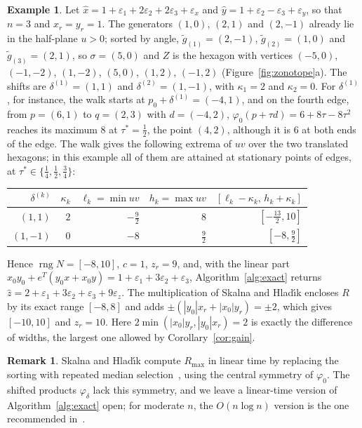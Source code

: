 \documentclass[11pt]{article}
\theoremstyle{definition}
\newtheorem{example}{Example}
\newtheorem{remark}{Remark}
\newcommand{\eps}{\varepsilon}
\newcommand{\ex}{\eps_x}
\newcommand{\ey}{\eps_y}
\newcommand{\rng}{\operatorname{rng}}
\begin{document}
\begin{example}
\label{ex:alg}
Let $\hat x=1+\eps_1+2\eps_2+2\eps_3+\ex$ and $\hat y=1+\eps_2-\eps_3+\ey$, so that $n=3$ and $x_r=y_r=1$. The generators $(1,0)$, $(2,1)$ and $(2,-1)$ already lie in the half-plane $u>0$; sorted by angle, $\tilde g_{(1)}=(2,-1)$, $\tilde g_{(2)}=(1,0)$ and $\tilde g_{(3)}=(2,1)$, so $\sigma=(5,0)$ and $Z$ is the hexagon with vertices $(-5,0)$, $(-1,-2)$, $(1,-2)$, $(5,0)$, $(1,2)$, $(-1,2)$ (Figure~\ref{fig:zonotope}a). The shifts are $\delta^{(1)}=(1,1)$ and $\delta^{(2)}=(1,-1)$, with $\kappa_1=2$ and $\kappa_2=0$. For $\delta^{(1)}$, for instance, the walk starts at $p_0+\delta^{(1)}=(-4,1)$, and on the fourth edge, from $p=(6,1)$ to $q=(2,3)$ with $d=(-4,2)$, $\varphi_0(p+\tau d)=6+8\tau-8\tau^2$ reaches its maximum $8$ at $\tau^*=\tfrac12$, the point $(4,2)$, although it is $6$ at both ends of the edge. The walk gives the following extrema of $uv$ over the two translated hexagons; in this example all of them are attained at stationary points of edges, at $\tau^*\in\{\tfrac14,\tfrac12,\tfrac34\}$:
\begin{center}
\small
\begin{tabular}{rrrrr}
\toprule
$\delta^{(k)}$ & $\kappa_k$ & $\ell_k=\min uv$ & $h_k=\max uv$ & $[\ell_k-\kappa_k,\,h_k+\kappa_k]$ \\
\midrule
$(1,1)$ & $2$ & $-\tfrac92$ & $8$ & $[-\tfrac{13}2,10]$ \\
$(1,-1)$ & $0$ & $-8$ & $\tfrac92$ & $[-8,\tfrac92]$ \\
\bottomrule
\end{tabular}
\end{center}
Hence $\rng N=[-8,10]$, $c=1$, $z_r=9$, and, with the linear part $x_0y_0+e^T(y_0x+x_0y)=1+\eps_1+3\eps_2+\eps_3$, Algorithm~\ref{alg:exact} returns $\hat z=2+\eps_1+3\eps_2+\eps_3+9\eps_z$. The multiplication of Skalna and Hlad\'{\i}k encloses $R$ by its exact range $[-8,8]$ and adds $\pm(|y_0|x_r+|x_0|y_r)=\pm2$, which gives $[-10,10]$ and $z_r=10$. Here $2\min(|x_0|y_r,|y_0|x_r)=2$ is exactly the difference of widths, the largest one allowed by Corollary~\ref{cor:gain}.
\end{example}

\begin{remark}
Skalna and Hlad\'{\i}k compute $R_{\max}$ in linear time by replacing the sorting with repeated median selection~\cite[Prop.~8]{skalna2017new}, using the central symmetry of $\varphi_0$. The shifted products $\varphi_\delta$ lack this symmetry, and we leave a linear-time version of Algorithm~\ref{alg:exact} open; for moderate $n$, the $O(n\log n)$ version is the one recommended in~\cite{skalna2017new}.
\end{remark}
\end{document}
